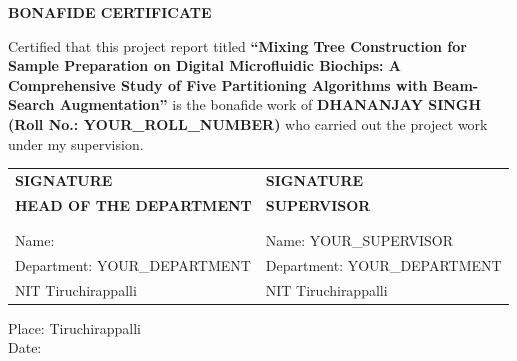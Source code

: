 \begin{center}
\textbf{\Large BONAFIDE CERTIFICATE}
\end{center}

\vspace{1cm}

Certified that this project report titled \textbf{``Mixing Tree Construction for Sample Preparation on Digital Microfluidic Biochips: A Comprehensive Study of Five Partitioning Algorithms with Beam-Search Augmentation''} is the bonafide work of \textbf{DHANANJAY SINGH (Roll No.: YOUR\_ROLL\_NUMBER)} who carried out the project work under my supervision.

\vspace{3cm}

\begin{tabular}{p{7cm}p{7cm}}
\textbf{SIGNATURE} & \textbf{SIGNATURE} \\
\textbf{HEAD OF THE DEPARTMENT} & \textbf{SUPERVISOR} \\
 & \\
 & \\
Name: & Name: YOUR\_SUPERVISOR \\
Department: YOUR\_DEPARTMENT & Department: YOUR\_DEPARTMENT \\
NIT Tiruchirappalli & NIT Tiruchirappalli \\
\end{tabular}

\vspace{2cm}

Place: Tiruchirappalli \\
Date:
